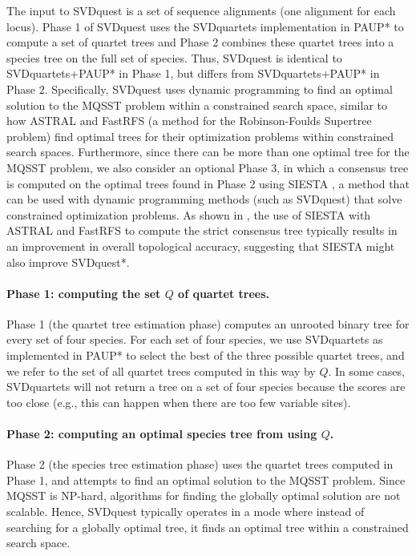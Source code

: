The input to SVDquest is a set of sequence alignments (one alignment
for each locus).  
Phase 1 of SVDquest uses the SVDquartets implementation in PAUP* to compute a set of quartet trees
and Phase 2 combines these quartet trees into a species tree on the
full set of species.  
Thus, SVDquest is identical to SVDquartets+PAUP* in Phase 1, but differs from SVDquartets+PAUP* in Phase 2.
{
Specifically, SVDquest uses dynamic programming to find an optimal solution to the MQSST problem within a constrained search space, similar to how ASTRAL and FastRFS \cite{fastrfs} (a method for the Robinson-Foulds Supertree problem) find optimal trees for their optimization problems within constrained search spaces.
Furthermore, since there can be more than one optimal tree for the MQSST problem, we}
also consider an optional Phase 3, in which a consensus tree is computed on the optimal trees found in Phase 2 using SIESTA \cite{siesta}, a method that
can be used with dynamic programming methods (such as SVDquest) that solve constrained
optimization problems.
 As shown in \cite{siesta}, the use of  SIESTA with ASTRAL and FastRFS   to compute the strict consensus tree typically results in an improvement in overall topological accuracy, 
 suggesting that SIESTA might also improve SVDquest*.





\paragraph{Phase 1: computing the set $Q$ of quartet trees. }
Phase 1 (the quartet tree estimation phase) computes 
an unrooted binary tree for every set  of four species. 
For each set of four species, we use SVDquartets as implemented in PAUP* to select the best
of the three possible quartet trees, and we refer to the set of all
quartet trees computed in this way by $Q$.  
In some cases, SVDquartets
will not return a tree on a set of four species because the scores are
too close (e.g., this can happen when there are too few variable
sites).


\paragraph{Phase 2: computing an optimal species tree from using 
$Q$. }
Phase 2 (the species tree estimation phase) uses the quartet trees
computed in Phase 1, and attempts to find an optimal solution to the MQSST problem.  
Since MQSST is NP-hard, algorithms for finding the globally optimal solution are not scalable. 
Hence, SVDquest typically operates in a mode
where instead of searching for a globally optimal tree, it finds an optimal tree within a constrained search space.

